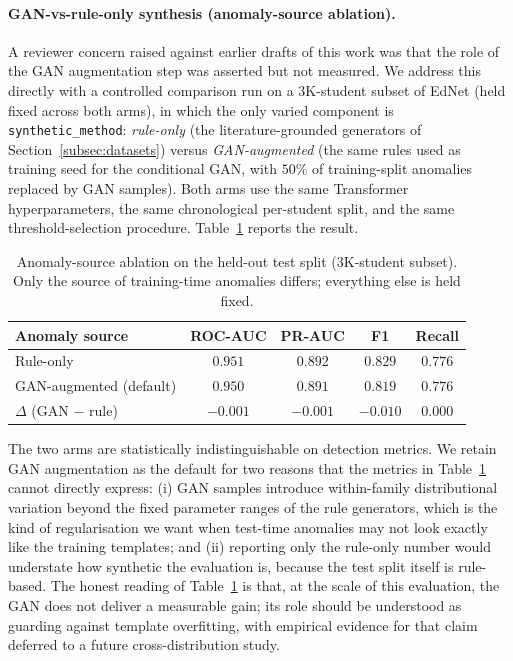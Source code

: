 \documentclass[sigconf]{acmart}
\begin{document}
\paragraph{GAN-vs-rule-only synthesis (anomaly-source ablation).} A reviewer concern raised against earlier drafts of this work was that the role of the GAN augmentation step was asserted but not measured. We address this directly with a controlled comparison run on a $3$K-student subset of EdNet (held fixed across both arms), in which the only varied component is \texttt{synthetic\_method}: \emph{rule-only} (the literature-grounded generators of Section~\ref{subsec:datasets}) versus \emph{GAN-augmented} (the same rules used as training seed for the conditional GAN, with $50\%$ of training-split anomalies replaced by GAN samples). Both arms use the same Transformer hyperparameters, the same chronological per-student split, and the same threshold-selection procedure. Table~\ref{tab:ablation_gan} reports the result.

\begin{table}[htbp]
\caption{Anomaly-source ablation on the held-out test split (3K-student subset). Only the source of training-time anomalies differs; everything else is held fixed.}
\label{tab:ablation_gan}
\centering
\small
\begin{tabular}{lcccc}
\toprule
\textbf{Anomaly source} & \textbf{ROC-AUC} & \textbf{PR-AUC} & \textbf{F1} & \textbf{Recall} \\
\midrule
Rule-only                       & $0.951$ & $0.892$ & $0.829$ & $0.776$ \\
GAN-augmented (default)         & $0.950$ & $0.891$ & $0.819$ & $0.776$ \\
\midrule
$\Delta$ (GAN $-$ rule)         & $-0.001$ & $-0.001$ & $-0.010$ & $0.000$ \\
\bottomrule
\end{tabular}
\end{table}

The two arms are statistically indistinguishable on detection metrics. We retain GAN augmentation as the default for two reasons that the metrics in Table~\ref{tab:ablation_gan} cannot directly express: (i) GAN samples introduce within-family distributional variation beyond the fixed parameter ranges of the rule generators, which is the kind of regularisation we want when test-time anomalies may not look exactly like the training templates; and (ii) reporting only the rule-only number would understate how synthetic the evaluation is, because the test split itself is rule-based. The honest reading of Table~\ref{tab:ablation_gan} is that, at the scale of this evaluation, the GAN does not deliver a measurable gain; its role should be understood as guarding against template overfitting, with empirical evidence for that claim deferred to a future cross-distribution study.
\end{document}
